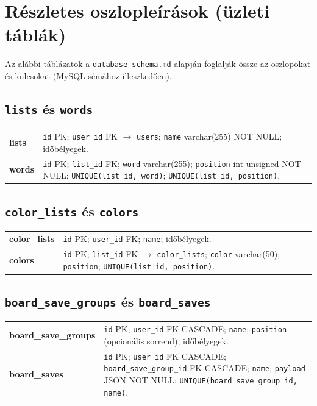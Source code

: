 \section{Részletes oszlopleírások (üzleti táblák)}
Az alábbi táblázatok a \texttt{database-schema.md} alapján foglalják össze az oszlopokat és kulcsokat (MySQL sémához illeszkedően).

\subsection{\texttt{lists} és \texttt{words}}
\begin{tabularx}{\textwidth}{@{}lX@{}}
\toprule
\textbf{lists} & \texttt{id} PK; \texttt{user\_id} FK $\rightarrow$ \texttt{users}; \texttt{name} varchar(255) NOT NULL; időbélyegek. \\
\textbf{words} & \texttt{id} PK; \texttt{list\_id} FK; \texttt{word} varchar(255); \texttt{position} int unsigned NOT NULL; \texttt{UNIQUE(list\_id, word)}; \texttt{UNIQUE(list\_id, position)}. \\
\bottomrule
\end{tabularx}

\subsection{\texttt{color\_lists} és \texttt{colors}}
\begin{tabularx}{\textwidth}{@{}lX@{}}
\toprule
\textbf{color\_lists} & \texttt{id} PK; \texttt{user\_id} FK; \texttt{name}; időbélyegek. \\
\textbf{colors} & \texttt{id} PK; \texttt{list\_id} FK $\rightarrow$ \texttt{color\_lists}; \texttt{color} varchar(50); \texttt{position}; \texttt{UNIQUE(list\_id, position)}. \\
\bottomrule
\end{tabularx}

\subsection{\texttt{board\_save\_groups} és \texttt{board\_saves}}
\begin{tabularx}{\textwidth}{@{}lX@{}}
\toprule
\textbf{board\_save\_groups} & \texttt{id} PK; \texttt{user\_id} FK CASCADE; \texttt{name}; \texttt{position} (opcionális sorrend); időbélyegek. \\
\textbf{board\_saves} & \texttt{id} PK; \texttt{user\_id} FK CASCADE; \texttt{board\_save\_group\_id} FK CASCADE; \texttt{name}; \texttt{payload} JSON NOT NULL; \texttt{UNIQUE(board\_save\_group\_id, name)}. \\
\bottomrule
\end{tabularx}

